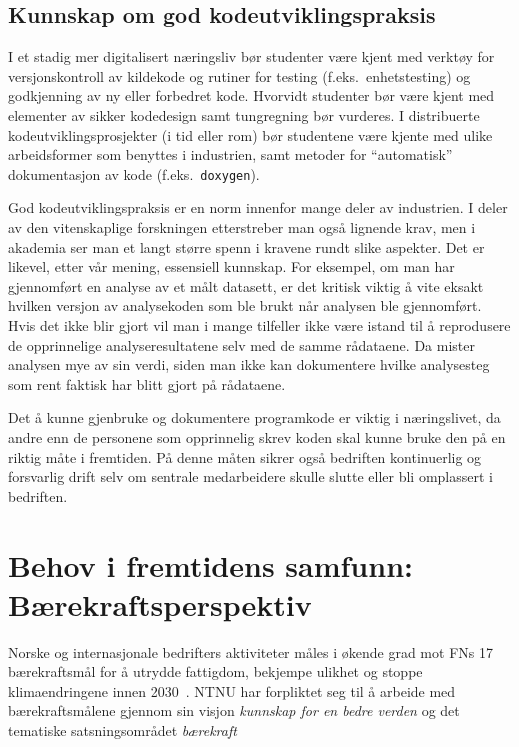 \documentclass{article}
\begin{document}
\subsection{Kunnskap om god kodeutviklingspraksis}
I et stadig mer digitalisert næringsliv bør studenter være kjent med verktøy for versjonskontroll av kildekode og rutiner for testing (f.eks.~enhetstesting) og godkjenning av ny eller forbedret kode. Hvorvidt studenter bør være kjent med elementer av sikker kodedesign samt tungregning bør vurderes. I distribuerte kodeutviklingsprosjekter (i tid eller rom) bør studentene være kjente med ulike  arbeidsformer som benyttes i industrien, samt metoder for ``automatisk'' dokumentasjon av kode (f.eks.~\verb+doxygen+).

God kodeutviklingspraksis er en norm innenfor mange deler av industrien. I deler av den vitenskaplige forskningen etterstreber man også lignende krav, men i akademia ser man et langt større spenn i kravene rundt slike aspekter. Det er likevel, etter vår mening, essensiell kunnskap. For eksempel, om man har gjennomført en analyse av et målt datasett, er det kritisk viktig å vite eksakt hvilken versjon av analysekoden som ble brukt når analysen ble gjennomført. Hvis det ikke blir gjort vil man i mange tilfeller ikke være istand til å reprodusere de opprinnelige analyseresultatene selv med de samme rådataene. Da mister analysen mye av sin verdi, siden man ikke kan dokumentere hvilke analysesteg som rent faktisk har blitt gjort på rådataene.

Det å kunne gjenbruke og dokumentere programkode er viktig i næringslivet, da andre enn de personene som opprinnelig skrev koden skal kunne bruke den på en riktig måte i fremtiden. På denne måten sikrer også bedriften kontinuerlig og forsvarlig drift selv om sentrale medarbeidere skulle slutte eller bli omplassert i bedriften.

\section{Behov i fremtidens samfunn: Bærekraftsperspektiv}
\label{sec:behov-bkraft}
Norske og internasjonale bedrifters aktiviteter måles i økende grad mot FNs 17 bærekraftsmål for å utrydde fattigdom, bekjempe ulikhet og stoppe klimaendringene innen 2030~\cite{FNsustgoals}.
NTNU har forpliktet seg til å arbeide med bærekraftsmålene gjennom sin visjon \emph{kunnskap for en bedre verden} og det tematiske satsningsområdet \emph{bærekraft}~\cite{NTNUStrategi,NTNUBaerekraftMaal,NTNUBaerekraft}
\end{document}
